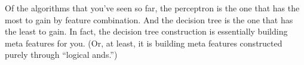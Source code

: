 \begin{comment}
To make things more formal, suppose that you are given a feature
vector $\vx$ in $D$-dimensional space.  Call these original features
the ``base features.''  There are several types of feature
combinations you could add:
\begin{enumerate}
\item Products: for all $d,d'$, create a feature whose value is $x_d
  \times x_{d'}$.  In the case of binary features, this corresponds to
  an ``and'' operation.
\item Sums: for all $d,d'$, create a feature whose value is $x_d
  + x_{d'}$.  In the case of binary features, this roughly corresponds to
  an ``or'' operation.
\item Log-transform: for all $d$, create a feature whose value is
  $\log x_d$.  (Only makes sense for non-negative features.)
\item Power-transform: for all $d$, create a feature whose value is
  $x_d^k$ for some $k$.
\end{enumerate}
Call features that are generated in these ways ``meta features.''
Now, there is nothing preventing you from combining meta features into
more complex ``meta meta features'' and so on.  Eventually you could
have a feature like:
\begin{equation}
  x_5 \times \log x_2 + (\log x_{10} + x_{16})^5 \times \log (x_{1}^2
  + x_{5})
\end{equation}
Such a feature might not be pariticularly \emph{useful}, but you could
certainly construct it.

In principle any one of these ``meta meta features'' might be
helpful.  Unfortunately, there is a combinatorial explosion of
possibilities, even with just these four constructions (technically
``power'' is unnecessary since it can be obtained through repeated
products).  Moreover, as you know, learning algorithms can be fooled
by features that look good by chance, but aren't actually good.  By
generating this combinatorial explosion of features, you run the risk
of creating \emph{many} features that look good by chance.
\end{comment}

Of the algorithms that you've seen so far, the perceptron is the one
that has the most to gain by feature combination.  And the decision
tree is the one that has the least to gain.  In fact, the decision
tree construction is essentially building meta features for you.  (Or,
at least, it is building meta features constructed purely through
``logical ands.'')


